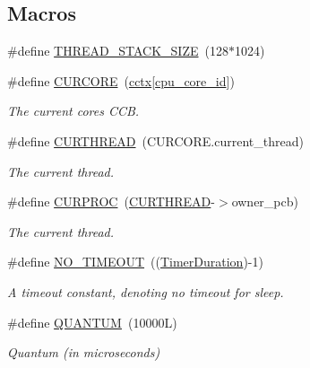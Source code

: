 \subsection*{Macros}
\begin{DoxyCompactItemize}
\item 
\#define \hyperlink{group__scheduler_ga90b7a8cb7bc3fdbd98014a3e15ee6e9a}{T\+H\+R\+E\+A\+D\+\_\+\+S\+T\+A\+C\+K\+\_\+\+S\+I\+ZE}~(128$\ast$1024)
\item 
\#define \hyperlink{group__scheduler_ga869aabe01f7b28027376354dd895b96b}{C\+U\+R\+C\+O\+RE}~(\hyperlink{group__scheduler_ga3be3b151b275926dff3fb99bee765eab}{cctx}\mbox{[}\hyperlink{bios_8h_abac58ced7d51f54f2318b326bc991933}{cpu\+\_\+core\+\_\+id}\mbox{]})\hypertarget{group__scheduler_ga869aabe01f7b28027376354dd895b96b}{}\label{group__scheduler_ga869aabe01f7b28027376354dd895b96b}

\begin{DoxyCompactList}\small\item\em The current core\textquotesingle{}s C\+CB. \end{DoxyCompactList}\item 
\#define \hyperlink{group__scheduler_ga587a82c8931f0df72f43cc913ceb7e27}{C\+U\+R\+T\+H\+R\+E\+AD}~(C\+U\+R\+C\+O\+R\+E.\+current\+\_\+thread)
\begin{DoxyCompactList}\small\item\em The current thread. \end{DoxyCompactList}\item 
\#define \hyperlink{group__scheduler_gae3437e8e6787ef05b6576d03c5b6a0ca}{C\+U\+R\+P\+R\+OC}~(\hyperlink{group__scheduler_ga587a82c8931f0df72f43cc913ceb7e27}{C\+U\+R\+T\+H\+R\+E\+AD}-\/$>$owner\+\_\+pcb)
\begin{DoxyCompactList}\small\item\em The current thread. \end{DoxyCompactList}\item 
\#define \hyperlink{group__scheduler_ga462fb2ba6f2af99ec3d021ded436bb65}{N\+O\+\_\+\+T\+I\+M\+E\+O\+UT}~((\hyperlink{bios_8h_ae7291e5cd742fb9bc6d4aaa0d51bd0ee}{Timer\+Duration})-\/1)\hypertarget{group__scheduler_ga462fb2ba6f2af99ec3d021ded436bb65}{}\label{group__scheduler_ga462fb2ba6f2af99ec3d021ded436bb65}

\begin{DoxyCompactList}\small\item\em A timeout constant, denoting no timeout for sleep. \end{DoxyCompactList}\item 
\#define \hyperlink{group__scheduler_gabc4f0f9abea1b5443308e4ea84b52b21}{Q\+U\+A\+N\+T\+UM}~(10000\+L)
\begin{DoxyCompactList}\small\item\em Quantum (in microseconds) \end{DoxyCompactList}\end{DoxyCompactItemize}
